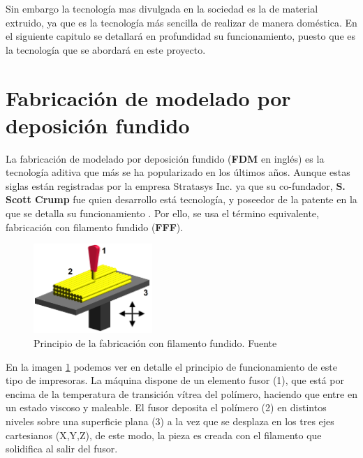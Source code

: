 Sin embargo la tecnología mas divulgada en la sociedad es la de material extruido, ya que es la tecnología más sencilla de realizar de manera doméstica. En el siguiente capitulo se detallará en profundidad su funcionamiento, puesto que es la tecnología que se abordará en este proyecto.

\section{Fabricación de modelado por deposición fundido}
La fabricación de modelado por deposición fundido (\textbf{FDM\textregistered} en inglés) es la tecnología aditiva que más se ha popularizado en los últimos años. Aunque estas siglas están registradas por la empresa Stratasys Inc. ya que su co-fundador,  \textbf{S. Scott Crump} fue quien desarrollo está tecnología, y poseedor de la patente en la que se detalla su funcionamiento \cite{crump1992apparatus}. Por ello, se usa el término equivalente, fabricación con filamento fundido (\textbf{FFF}).\\  
    
    \begin{figure}[H]
            \centering
            \includegraphics[width=0.4\textwidth]{images/FDM_by_Zureks.png}
            \caption{Principio de la fabricación con filamento fundido. Fuente \cite{fundamentoFDM}}
            \label{fig:impr_fdm}
    \end{figure}

En la imagen \ref{fig:impr_fdm} podemos ver en detalle el principio de funcionamiento de este tipo de impresoras. La máquina dispone de un elemento fusor (1), que está por encima de la temperatura de transición vítrea del polímero, haciendo que entre en un estado viscoso y maleable. El fusor deposita el polímero (2) en distintos niveles sobre una superficie plana (3) a la vez que se desplaza en los tres ejes cartesianos (X,Y,Z), de este modo, la pieza es creada con el filamento que solidifica al salir del fusor.\\

